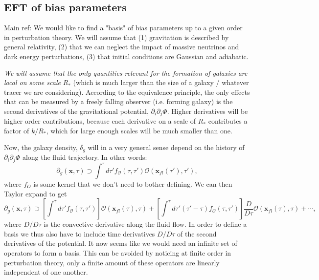 \documentclass[11pt]{article}
\newcommand{\sbr}[1]{\ensuremath{\left[ #1 \right]}}
\begin{document}
\subsection{EFT of bias parameters}
Main ref: \cite{Desjacques_2018}
We would like to find a "basis" of bias parameters up to a given order in perturbation theory. We will assume that (1) gravitation is described by general relativity, (2) that we can neglect the impact of massive neutrinos and dark energy perturbations, (3) that initial conditions are Gaussian and adiabatic.

\emph{We will assume that the only quantities relevant for the formation of galaxies are local on some scale} $R_*$ (which is much larger than the size of a galaxy / whatever tracer we are considering). According to the equivalence principle, the only effects that can be measured by a freely falling observer (i.e. forming galaxy) is the second derivatives of the gravitational potential, $\partial_i \partial_j \Phi$. Higher derivatives will be higher order contributions, because each derivative on a scale of $R_*$ contributes a factor of $k/R_*$, which for large enough scales will be much smaller than one.

Now, the galaxy density, $\delta_g$ %
will in a very general sense depend on the history of $\partial_i \partial_j \Phi$ along the fluid trajectory. In other words:
\begin{equation}
    \partial_g(\mathbf x, \tau) \supset \int^\tau d\tau'f_{\mathcal O }(\tau, \tau') \mathcal O (\mathbf x_{fl}(\tau'), \tau'),
\end{equation}
where $f_O$ is some kernel that we don't need to bother defining. %
We can then Taylor expand to get
\begin{equation}
    \partial_g(\mathbf x, \tau) \supset \sbr{\int^\tau d\tau'f_{\mathcal O }(\tau, \tau')} \mathcal O (\mathbf x_{fl}(\tau), \tau) + \sbr{\int^\tau d\tau' (\tau'-\tau) f_{\mathcal O }(\tau, \tau')} \frac{D}{D\tau}\mathcal O (\mathbf x_{fl}(\tau), \tau) + \cdots,
\end{equation}
where $D/D\tau$ is the convective derivative along the fluid flow. %
In order to define a basis we thus also have to include time derivatives $D/D\tau$ of the second derivatives of the potential. It now seems like we would need an infinite set of operators to form a basis. This can be avoided by noticing at finite order in perturbation theory, only a finite amount of these operators are linearly independent of one another.
\end{document}
